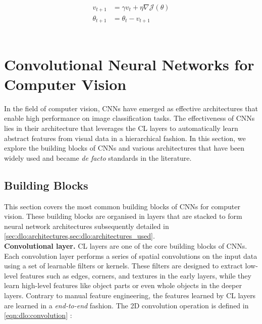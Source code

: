 \begin{equation}
  \label{eqn:dlo:sgd_momentum_update}
  \begin{split}
    v_{t+1} &= \gamma v_t + \eta \nabla \mathcal{J}(\theta) \\
    \theta_{t+1} &= \theta_t - v_{t+1}
  \end{split}
\end{equation}\\

\section{Convolutional Neural Networks for Computer Vision}\label{sec:dlo:cnn}

In the field of computer vision, \acp{CNN} have emerged as effective
architectures that enable high performance on image classification tasks. The
effectiveness of \acp{CNN} lies in their architecture that leverages the \ac{CL}
layers to automatically learn abstract features from visual data in a
hierarchical fashion. In this section, we explore the building blocks of
\acp{CNN} and various architectures that have been widely used and became
\emph{de facto} standards in the literature.

\subsection{Building Blocks}

This section covers the most common building blocks of \acp{CNN} for computer
vision. These building blocks are organised in layers that are stacked to form
neural network architectures subsequently detailed in
\cref{sec:dlo:architectures,sec:dlo:architectures_used}.\\

\noindent\textbf{Convolutional layer.} \ac{CL} layers are one of the core
building blocks of \acp{CNN}. Each convolution layer performs a series of
spatial convolutions on the input data using a set of learnable filters or
kernels. These filters are designed to extract low-level features such as edges,
corners, and textures in the early layers, while they learn high-level features
like object parts or even whole objects in the deeper layers. Contrary to manual
feature engineering, the features learned by \ac{CL} layers are learned in a
\emph{end-to-end} fashion. The 2D convolution operation is defined in
\cref{eqn:dlo:convolution} :\\

